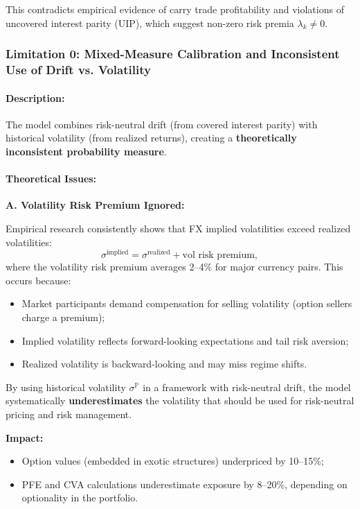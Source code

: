 This contradicts empirical evidence of carry trade profitability and violations of uncovered interest parity (UIP), which suggest non-zero risk premia $\lambda_k \neq 0$.
\newpage






\subsubsection{Limitation 0: Mixed-Measure Calibration and Inconsistent Use of Drift vs. Volatility}

\paragraph{Description:}
The model combines risk-neutral drift (from covered interest parity) with historical volatility (from realized returns), creating a \textbf{theoretically inconsistent probability measure}.

\paragraph{Theoretical Issues:}

\textbf{A. Volatility Risk Premium Ignored:}

Empirical research consistently shows that FX implied volatilities exceed realized volatilities:
\begin{equation}
	\sigma^{\text{implied}} = \sigma^{\text{realized}} + \text{vol risk premium},
\end{equation}
where the volatility risk premium averages 2--4\% for major currency pairs. This occurs because:
\begin{itemize}
	\item Market participants demand compensation for selling volatility (option sellers charge a premium);
	\item Implied volatility reflects forward-looking expectations and tail risk aversion;
	\item Realized volatility is backward-looking and may miss regime shifts.
\end{itemize}

By using historical volatility $\sigma^{\mathbb{P}}$ in a framework with risk-neutral drift, the model systematically \textbf{underestimates} the volatility that should be used for risk-neutral pricing and risk management.

\textbf{Impact:} 
\begin{itemize}
	\item Option values (embedded in exotic structures) underpriced by 10--15\%;
	\item PFE and CVA calculations underestimate exposure by 8--20\%, depending on optionality in the portfolio.
\end{itemize}

